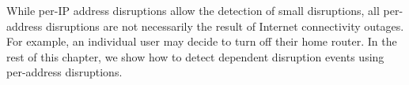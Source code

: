 While per-IP address disruptions allow the detection of small
disruptions, all per-address disruptions are not necessarily the
result of Internet connectivity outages. For example, an individual
user may decide to turn off their home router. In the rest of this
chapter, we show how to detect dependent disruption events using
per-address disruptions.